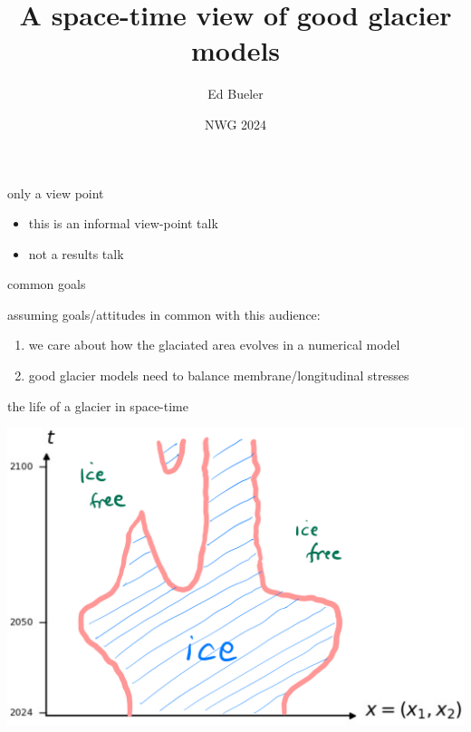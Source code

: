 \documentclass[10pt,dvipsnames]{beamer}
\title{A space-time view of good glacier models}
\date{NWG 2024}
\author{Ed Bueler}
\institute{University of Alaska Fairbanks}
\begin{document}
\graphicspath{{figs/}}

\maketitle





\begin{frame}{only a view point}

\begin{itemize}
\item this is an informal view-point talk
\item not a results talk
\end{itemize}
\end{frame}


\begin{frame}{common goals}

assuming goals/attitudes in common with this audience:
\begin{enumerate}
\item we care about how the glaciated area evolves in a numerical model
\item good glacier models need to balance membrane/longitudinal stresses
\end{enumerate}
\end{frame}


\begin{frame}{the life of a glacier in space-time}

\bigskip
\hfill \includegraphics[width=\textwidth]{xtcartoon}
\end{frame}
\end{document}
